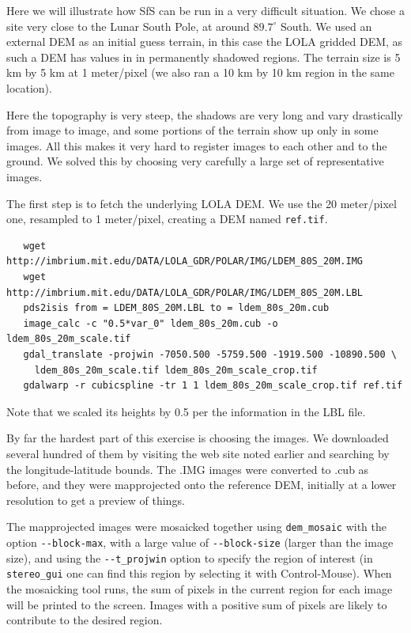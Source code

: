 Here we will illustrate how SfS can be run in a very difficult
situation. We chose a site very close to the Lunar South Pole, at around
$89.7^\circ$ South. We used an external DEM as an initial guess terrain,
in this case the LOLA gridded DEM, as such a DEM has values in in
permanently shadowed regions. The terrain size is 5 km by 5 km at 1
meter/pixel (we also ran a 10 km by 10 km region in the same location).

Here the topography is very steep, the shadows are very long and vary
drastically from image to image, and some portions of the terrain show
up only in some images. All this makes it very hard to register images
to each other and to the ground. We solved this by choosing very carefully
a large set of representative images. 

The first step is to fetch the underlying LOLA DEM. We use the 20
meter/pixel one, resampled to 1 meter/pixel, creating a DEM
named \texttt{ref.tif}.

\begin{verbatim}
   wget http://imbrium.mit.edu/DATA/LOLA_GDR/POLAR/IMG/LDEM_80S_20M.IMG
   wget http://imbrium.mit.edu/DATA/LOLA_GDR/POLAR/IMG/LDEM_80S_20M.LBL
   pds2isis from = LDEM_80S_20M.LBL to = ldem_80s_20m.cub
   image_calc -c "0.5*var_0" ldem_80s_20m.cub -o ldem_80s_20m_scale.tif
   gdal_translate -projwin -7050.500 -5759.500 -1919.500 -10890.500 \
     ldem_80s_20m_scale.tif ldem_80s_20m_scale_crop.tif
   gdalwarp -r cubicspline -tr 1 1 ldem_80s_20m_scale_crop.tif ref.tif
\end{verbatim}

Note that we scaled its heights by 0.5 per the information in the LBL file.

By far the hardest part of this exercise is choosing the images. We
downloaded several hundred of them by visiting the web site noted
earlier and searching by the longitude-latitude bounds. The .IMG images
were converted to .cub as before, and they were mapprojected onto the
reference DEM, initially at a lower resolution to get a preview of
things. 

The mapprojected images were mosaicked together using
\texttt{dem\_mosaic} with the option \texttt{-\/-block-max}, with a
large value of \texttt{-\/-block-size} (larger than the image size), and
using the \texttt{-\/-t\_projwin} option to specify the region of
interest (in \texttt{stereo\_gui} one can find this region by selecting
it with Control-Mouse).  When the mosaicking tool runs, the sum of
pixels in the current region for each image will be printed to the
screen. Images with a positive sum of pixels are likely to contribute to
the desired region.

